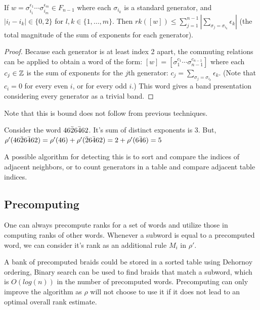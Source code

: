 \documentclass[12pt]{thesis}
\begin{document}
\begin{proposition}
    If $w = \sigma_{i_{1}}^{\epsilon_{1}} \cdots \sigma_{i_{m}}^{\epsilon_{m}} \in F_{n-1}$
    where each $\sigma_{i_{k}}$ is a standard generator,
    and $|i_{l} - i_{k}| \in \{ 0,  2 \}$ for $l, k \in \{ 1, \ldots, m \}$.
    Then $rk([w]) \leq \sum_{j=1}^{n-1} |\sum_{\sigma_{j} = \sigma_{i_{k}}} \epsilon_{k}|$ (the total magnitude
    of the sum of exponents for each generator).
\end{proposition}

\begin{proof}
    Because each generator is at least index 2 apart, 
    the commuting relations can be applied
    to obtain a word of the form: $[w] = [\sigma_{1}^{c_{1}} \cdots \sigma_{n-1}^{c_{n-1}}]$
    where each $c_{j} \in \mathbb{Z}$ is the sum of exponents for the $j$th generator: $c_{j} = \sum_{\sigma_{j} = \sigma_{i_{k}}} \epsilon_{k}$.
    (Note that $c_{i} = 0$ for every even $i$,
    or for every odd $i$.)
    This word gives a band presentation considering every
    generator as a trivial band. 
\end{proof}

Note that this is bound does not follow from previous techniques.
\begin{example}
Consider the word $4 6 \bar{2} 6 \bar{4} 6 2$.
It's sum of distinct exponents is $3$.
But,
$\rho'(4 6 \bar{2} 6 \bar{4} 6 2) = \rho'(4 6) + \rho'(\bar{2} 6 \bar{4} 6 2) = 2 + \rho'(6 \bar{4} 6) = 5$
\end{example}

A possible algorithm for detecting this
is to sort and compare the indices of adjacent neighbors,
or to count generators in a table and compare adjacent table indices.

\subsection{Precomputing}

One can always precompute ranks for a set of words
and utilize those in computing ranks of other words.
Whenever a subword is equal to a precomputed
word, 
we can consider it's rank as an additional rule $M_{i}$ in $\rho'$.

A bank of precomputed braids could be stored in a sorted table
using Dehornoy ordering, 
Binary search can be used to find braids that match a subword, which is $O(log(n))$
in the number of precomputed words.
Precomputing can only improve the algorithm as $\rho$ will
not choose to use it
if it does not lead to an optimal overall rank estimate.
\end{document}
